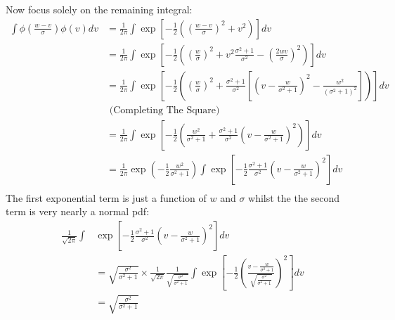 Now focus solely on the remaining integral:
\begin{align*}
\int \phi\left(\frac{w - v}{\sigma}\right) \phi(v) dv  &= 
\frac{1}{2\pi}  
\int \exp \left[
    -\frac{1}{2} 
    \left(
        \left(\frac{w - v}{\sigma}\right)^2 +
        v^2
    \right)
\right] dv \\
&=
\frac{1}{2\pi}
 \int \exp \left[
    -\frac{1}{2} 
    \left(
        \left(\frac{w }{\sigma}\right)^2 +
        v^2 \frac{\sigma^2 + 1}{\sigma^2}  
        -\left(\frac{2wv }{\sigma}\right)^2 
    \right)
\right] dv \\
&=
\frac{1}{2\pi}
 \int \exp \left[
    -\frac{1}{2} 
    \left(
        \left(\frac{w }{\sigma}\right)^2 +
        \frac{\sigma^2 + 1}{\sigma^2} \left[
            \left(
                v - \frac{w}{\sigma^2 + 1}
            \right)^2 - \frac{w^2}{(\sigma^2 + 1)^2}
        \right]
    \right)
\right] dv \\ &\text{ (Completing  The Square)} \\
&=
\frac{1}{2\pi}
 \int \exp \left[
    -\frac{1}{2} 
    \left(
        \frac{w^2 }{\sigma^2 + 1} +
        \frac{\sigma^2 + 1}{\sigma^2} 
            \left(
                v - \frac{w}{\sigma^2 + 1}
            \right)^2 
    \right)
\right] dv \  \\
&= 
\frac{1}{2\pi}
 \exp \left(
    -\frac{1}{2} 
        \frac{w^2 }{\sigma^2 + 1}
         \right)
\int \exp\left[
    -\frac{1}{2}
        \frac{\sigma^2 + 1}{\sigma^2} 
            \left(
                v - \frac{w}{\sigma^2 + 1}
            \right)^2 
\right] dv \  \\
\end{align*}
The first exponential term is just a function of $w$ and $\sigma$ 
whilst the the second term is very nearly a normal pdf:
\begin{align*}
\frac{1}{\sqrt{2\pi}}
\int &\exp\left[
    -\frac{1}{2}
        \frac{\sigma^2 + 1}{\sigma^2} 
            \left(
                v - \frac{w}{\sigma^2 + 1}
            \right)^2 
\right] dv  \\
&=  
                    \sqrt{
                        \frac{\sigma^2}{\sigma^2 + 1}
                    } \times
\frac{1}{\sqrt{2\pi}} 
\frac{1}{
                    \sqrt{
                        \frac{\sigma^2}{\sigma^2 + 1}
                    }
}
\int \exp\left[
    -\frac{1}{2}
            \left(
                \frac{v - \frac{w}{\sigma^2 + 1}}{
                    \sqrt{
                        \frac{\sigma^2}{\sigma^2 + 1}
                    }
                }
            \right)^2 
\right] dv  \\
&= 
                    \sqrt{
                        \frac{\sigma^2}{\sigma^2 + 1}
                    } 
\end{align*}
